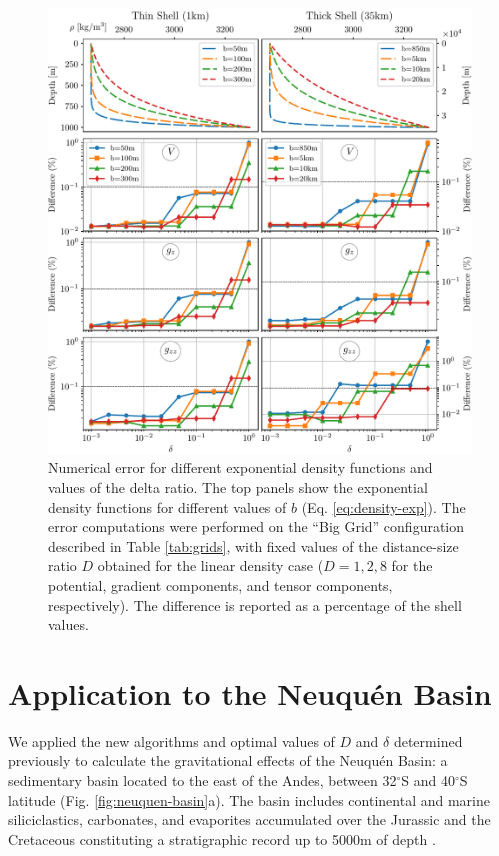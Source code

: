 \documentclass[extra]{gji}
\begin{document}
\begin{figure}
\centering
\includegraphics[width=\linewidth]{figures/exponential-delta.pdf}
\caption{
    Numerical error for different exponential density functions and values of the delta
    ratio.
    The top panels show the exponential density functions for different values of $b$
    (Eq. \ref{eq:density-exp}).
    The error computations were performed on the ``Big Grid'' configuration described in
    Table \ref{tab:grids}, with fixed values of the distance-size ratio
    $D$ obtained for the linear density case ($D=1, 2, 8$ for the
    potential, gradient components, and tensor components, respectively).
    The difference is reported as a percentage of the shell values.
    }
\label{fig:delta-exponential}
\end{figure}



\section{Application to the Neuqu\'en Basin}

We applied the new algorithms and optimal values of $D$ and $\delta$ determined
previously to calculate the gravitational effects of the Neuqu\'en Basin:
a sedimentary basin
located to the east of the Andes, between 32$^\circ$S and 40$^\circ$S latitude
(Fig. \ref{fig:neuquen-basin}a).
The basin includes continental and marine siliciclastics, carbonates, and evaporites
accumulated over the Jurassic and the Cretaceous constituting a stratigraphic record up
to 5000m of depth \citep{Howell2005}.
\end{document}
